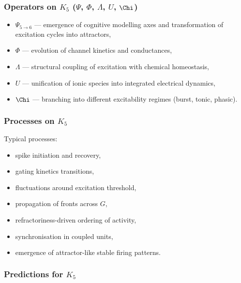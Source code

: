 \subsubsection{Operators on \texorpdfstring{$K_5$}{K_5} (\texorpdfstring{$\Psi$}{\Psi}, \texorpdfstring{$\Phi$}{\Phi}, \texorpdfstring{$\Lambda$}{\Lambda}, \texorpdfstring{$U$}{U}, \texorpdfstring{$\Chi$}{\Chi})}

\begin{itemize}
    \item $\Psi_{5\to6}$ — emergence of cognitive modelling axes and
          transformation of excitation cycles into attractors,
    \item $\Phi$ — evolution of channel kinetics and conductances,
    \item $\Lambda$ — structural coupling of excitation with chemical
          homeostasis,
    \item $U$ — unification of ionic species into integrated electrical
          dynamics,
    \item $\Chi$ — branching into different excitability regimes (burst,
          tonic, phasic).
\end{itemize}

\subsubsection{Processes on \texorpdfstring{$K_5$}{K_5}}

Typical processes:
\begin{itemize}
    \item spike initiation and recovery,
    \item gating kinetics transitions,
    \item fluctuations around excitation threshold,
    \item propagation of fronts across $G$,
    \item refractoriness-driven ordering of activity,
    \item synchronisation in coupled units,
    \item emergence of attractor-like stable firing patterns.
\end{itemize}

\subsubsection{Predictions for \texorpdfstring{$K_5$}{K_5}}

